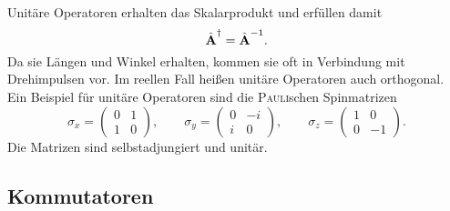 \documentclass[a4paper,12pt,portrait]{book}
\numberwithin{equation}{section}
\begin{document}
Unitäre Operatoren erhalten das Skalarprodukt und erfüllen damit
\begin{equation*}
\hat{\textbf{A}}^\dagger=\hat{\textbf{A}}^{-1}.
\end{equation*}
Da sie Längen und Winkel erhalten, kommen sie oft in Verbindung mit Drehimpulsen vor.
Im reellen Fall heißen unitäre Operatoren auch orthogonal. Ein Beispiel für unitäre Operatoren sind die \textsc{Pauli}schen Spinmatrizen
\begin{equation*}
\sigma_x = \begin{pmatrix}
0 & 1 \\
1 & 0 
\end{pmatrix},\qquad
\sigma_y = \begin{pmatrix}
0 & -i \\
i & 0 
\end{pmatrix}, \qquad
\sigma_z = \begin{pmatrix}
1 & 0 \\
0 & -1
\end{pmatrix}.
\end{equation*}
Die Matrizen sind selbstadjungiert und unitär. 

\subsection{Kommutatoren}
\end{document}
